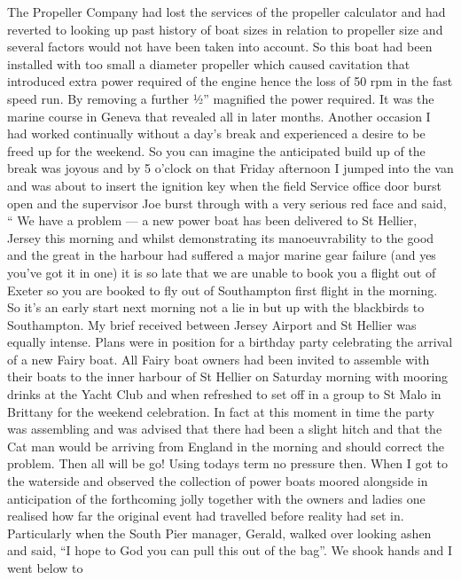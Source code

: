 
The Propeller Company had lost the services of the propeller calculator and had
reverted to looking up past history of boat sizes in relation to propeller size
and several factors would not have been taken into account. So this boat had
been installed with too small a diameter propeller which caused cavitation that
introduced extra power required of the engine hence the loss of 50 rpm in the
fast speed run. By removing a further ½'' magnified the power required. It
was the marine course in Geneva that revealed all in later months. Another
occasion I had worked continually without a day's break and experienced a
desire to be freed up for the weekend. So you can imagine the anticipated
build up of the break was joyous and by 5 o'clock on that Friday afternoon I
jumped into the van and was about to insert the ignition key when the field
Service office door burst open and the supervisor Joe burst through with a very
serious red face and said, `` We have a problem --- a new power boat has been
delivered to St Hellier, Jersey this morning and whilst demonstrating its
manoeuvrability to the good and the great in the harbour had suffered a major
marine gear failure (and yes you've got it in one) it is so late that we are
unable to book you a flight out of Exeter so you are booked to fly out of
Southampton first flight in the morning. So it's an early start next morning
not a lie in but up with the blackbirds to Southampton. My brief received
between Jersey Airport and St Hellier was equally intense. Plans were in
position for a birthday party celebrating the arrival of a new Fairy boat. All
Fairy boat owners had been invited to assemble with their boats to the inner
harbour of St Hellier on Saturday morning with mooring drinks at the Yacht Club
and when refreshed to set off in a group to St Malo in Brittany for the weekend
celebration. In fact at this moment in time the party was assembling and was
advised that there had been a slight hitch and that the Cat man would be
arriving from England in the morning and should correct the problem. Then all
will be go! Using todays term no pressure then. When I got to the waterside
and observed the collection of power boats moored alongside in anticipation of
the forthcoming jolly together with the owners and ladies one realised how far
the original event had travelled before reality had set in. Particularly when
the South Pier manager, Gerald, walked over looking ashen and said, ``I hope to
God you can pull this out of the bag''. We shook hands and I went below to
